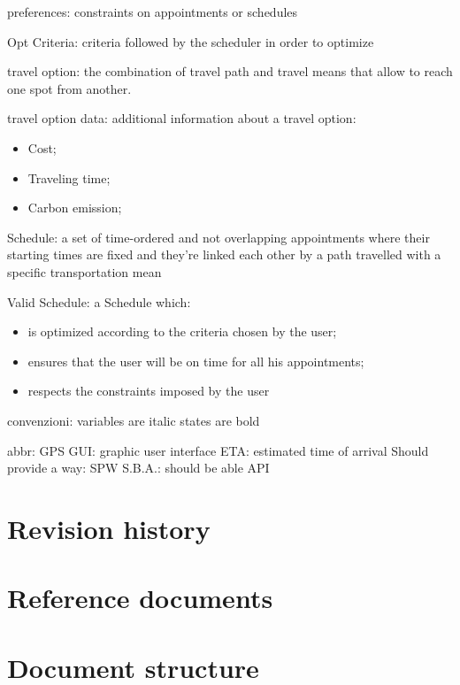 preferences: constraints on appointments or schedules

Opt Criteria: criteria followed by the scheduler in order to optimize

travel option: the combination of travel path and travel means that allow to reach one spot from another.

travel option data: additional information about a travel option:
\begin{itemize}
\item Cost;
\item Traveling time;
\item Carbon emission;
\end{itemize}

Schedule: a set of time-ordered and not overlapping appointments where their starting times are fixed and they're linked each other by a path travelled with a specific transportation mean

Valid Schedule: a Schedule which:
\begin{itemize}
\item is optimized according to the criteria chosen by the user;
\item ensures that the user will be on time for all his appointments;
\item respects the constraints imposed by the user
\end{itemize}


convenzioni:
variables are italic
states are bold

abbr:
GPS
GUI: graphic user interface
ETA: estimated time of arrival
Should provide a way: SPW
S.B.A.: should be able 
API


\section{Revision history}

\section{Reference documents}

\section{Document structure}